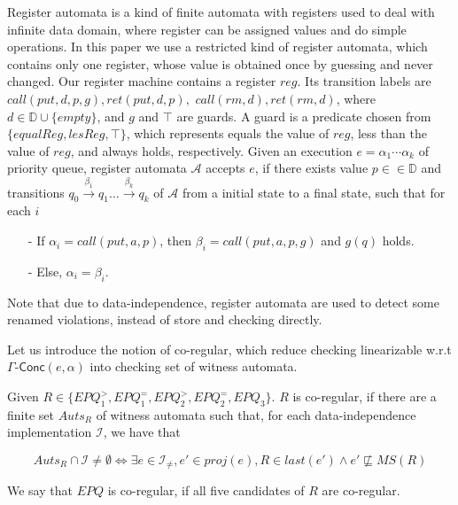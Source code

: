 Register automata is a kind of finite automata with registers used to deal with infinite data domain, where register can be assigned values and do simple operations. In this paper we use a restricted kind of register automata, which contains only one register, whose value is obtained once by guessing and never changed. Our register machine contains a register $\textit{reg}$. Its transition labels are $\textit{call}(\textit{put},d,p,g), \textit{ret}(\textit{put},d,p),$ $\textit{call}(\textit{rm},d),\textit{ret}(\textit{rm},d)$, where $d \in \mathbb{D} \cup \{ \textit{empty} \}$, and $g$ and $\top$ are guards. A guard is a predicate chosen from $\{\textit{equalReg},\textit{lesReg},\top \}$, which represents equals the value of $\textit{reg}$, less than the value of $\textit{reg}$, and always holds, respectively. Given an execution $e = \alpha_1 \cdots \alpha_k$ of priority queue, register automata $\mathcal{A}$ accepts $e$, if there exists value $p \in \in \mathbb{D}$ and transitions $q_0 \xrightarrow{\beta_1} q_1 \ldots \xrightarrow{\beta_k} q_k$ of $\mathcal{A}$ from a initial state to a final state, such that for each $i$

\begin{itemize}
\setlength{\itemsep}{0.5pt}
\item[-] If $\alpha_i = \textit{call}(\textit{put},a,p)$, then $\beta_i= \textit{call}(\textit{put},a,p,g)$ and $g(q)$ holds. 

\item[-] Else, $\alpha_i = \beta_i$. 
\end{itemize}

Note that due to data-independence, register automata are used to detect some renamed violations, instead of store and checking directly. 




Let us introduce the notion of co-regular, which reduce checking linearizable w.r.t $\Gamma\mathsf{\text{-}Conc}(e,\alpha)$ into checking set of witness automata.

\begin{definition}\label{def:co-regular of rules of extended priority queues}
Given $R \in \{ \textit{EPQ}_1^{>}, \textit{EPQ}_1^{=}, \textit{EPQ}_2^{>}, \textit{EPQ}_2^{=}, \textit{EPQ}_3 \}$. $R$ is co-regular, if there are a finite set $\textit{Auts}_{R}$ of witness automata such that, for each data-independence implementation $\mathcal{I}$, we have that

$$\textit{Auts}_{R} \cap \mathcal{I} \neq \emptyset \Leftrightarrow \exists e \in \mathcal{I}_{\neq},e' \in \textit{proj}(e), R \in last(e') \wedge e' \not\sqsubseteq \textit{MS}(R)$$

We say that $\textit{EPQ}$ is co-regular, if all five candidates of $R$ are co-regular.
\end{definition}

